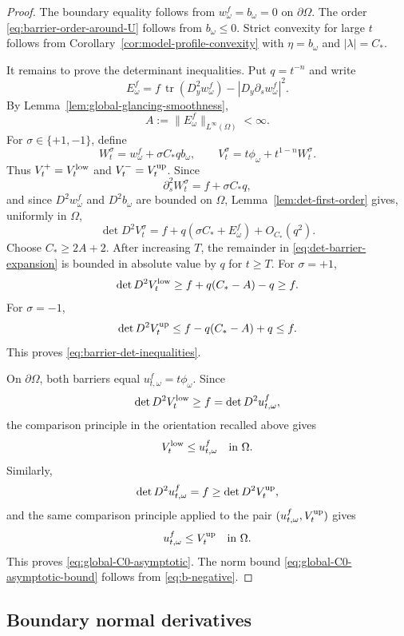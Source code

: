 \documentclass[11pt]{article}
\numberwithin{equation}{section}
\newcommand{\tr}{\operatorname{tr}}
\begin{document}
\begin{proof}
The boundary equality follows from \(w_\omega^f=b_\omega=0\) on \(\partial\Omega\).  The order \eqref{eq:barrier-order-around-U} follows from \(b_\omega\le0\).  Strict convexity for large \(t\) follows from Corollary~\ref{cor:model-profile-convexity} with \(\eta=b_\omega\) and \(|\lambda|=C_*\).

It remains to prove the determinant inequalities.  Put \(q=t^{-n}\) and write
\[
    E_\omega^f
    =
    f\,\tr(D_y^2w_\omega^f)
    -|D_y\partial_s w_\omega^f|^2 .
\]
By Lemma~\ref{lem:global-glancing-smoothness},
\begin{equation}\label{eq:E-bound-global}
    A:=\|E_\omega^f\|_{L^\infty(\Omega)}<\infty .
\end{equation}
For \(\sigma\in\{+1,-1\}\), define
\[
    W_t^\sigma=w_\omega^f+\sigma C_*q b_\omega,
    \qquad
    V_t^\sigma=t\phi_\omega+t^{1-n}W_t^\sigma .
\]
Thus \(V_t^+=V_t^{\rm low}\) and \(V_t^-=V_t^{\rm up}\).  Since
\[
    \partial_s^2W_t^\sigma=f+\sigma C_*q,
\]
and since \(D^2w_\omega^f\) and \(D^2b_\omega\) are bounded on \(\Omega\), Lemma~\ref{lem:det-first-order} gives, uniformly in \(\Omega\),
\begin{equation}\label{eq:det-barrier-expansion}
    \det D^2V_t^\sigma
    =
    f
    +q\left(\sigma C_*+E_\omega^f\right)
    +O_{C_*}(q^2).
\end{equation}
Choose \(C_*\ge 2A+2\).  After increasing \(T\), the remainder in \eqref{eq:det-barrier-expansion} is bounded in absolute value by \(q\) for \(t\ge T\).  For \(\sigma=+1\),
\[
    \det D^2V_t^{\rm low}
    \ge
    f+q(C_*-A)-q
    \ge f.
\]
For \(\sigma=-1\),
\[
    \det D^2V_t^{\rm up}
    \le
    f-q(C_*-A)+q
    \le f.
\]
This proves \eqref{eq:barrier-det-inequalities}.

On \(\partial\Omega\), both barriers equal \(u_{t,\omega}^f=t\phi_\omega\).  Since
\[
    \det D^2V_t^{\rm low}\ge f=\det D^2u_{t,\omega}^f,
\]
the comparison principle in the orientation recalled above gives
\[
    V_t^{\rm low}\le u_{t,\omega}^f
    \quad\text{in }\Omega.
\]
Similarly,
\[
    \det D^2u_{t,\omega}^f=f\ge \det D^2V_t^{\rm up},
\]
and the same comparison principle applied to the pair \((u_{t,\omega}^f,V_t^{\rm up})\) gives
\[
    u_{t,\omega}^f\le V_t^{\rm up}
    \quad\text{in }\Omega.
\]
This proves \eqref{eq:global-C0-asymptotic}.  The norm bound \eqref{eq:global-C0-asymptotic-bound} follows from \eqref{eq:b-negative}.
\end{proof}

\subsection{Boundary normal derivatives}\label{subsec:boundary-normal-derivatives}
\end{document}

